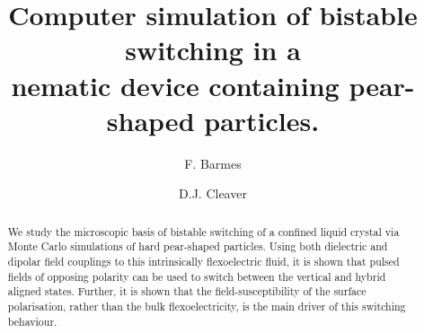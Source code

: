 \documentclass[aps,10pt,twocolumn]{revtex4}
\begin{document}
\graphicspath
{
{../imgs/}
}

\title{Computer simulation of bistable switching in a \\nematic
device containing pear-shaped particles.}

\author{F. Barmes}


\author{D.J. Cleaver}




\begin{abstract}
We study the microscopic basis of bistable switching of a confined liquid crystal via Monte Carlo simulations of
hard pear-shaped particles. Using both dielectric and dipolar field couplings to this intrinsically flexoelectric
fluid, it is shown that pulsed fields of opposing polarity can be used to switch between the vertical and hybrid
aligned states. Further, it is shown that the field-susceptibility of the surface polarisation, rather than the
bulk flexoelectricity, is the main driver of this switching behaviour.
\end{abstract}














\maketitle
\end{document}
